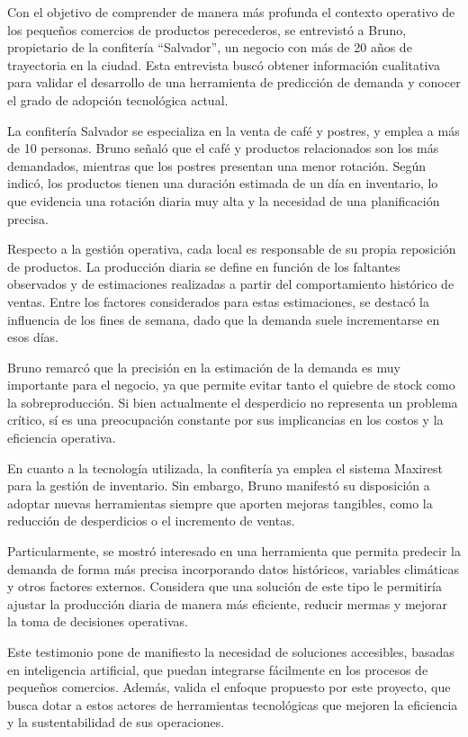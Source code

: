 Con el objetivo de comprender de manera más profunda el contexto operativo de los pequeños comercios de productos perecederos, se entrevistó a Bruno, propietario de la confitería ``Salvador'', un negocio con más de 20 años de trayectoria en la ciudad. Esta entrevista buscó obtener información cualitativa para validar el desarrollo de una herramienta de predicción de demanda y conocer el grado de adopción tecnológica actual.

La confitería Salvador se especializa en la venta de café y postres, y emplea a más de 10 personas. Bruno señaló que el café y productos relacionados son los más demandados, mientras que los postres presentan una menor rotación. Según indicó, los productos tienen una duración estimada de un día en inventario, lo que evidencia una rotación diaria muy alta y la necesidad de una planificación precisa.

Respecto a la gestión operativa, cada local es responsable de su propia reposición de productos. La producción diaria se define en función de los faltantes observados y de estimaciones realizadas a partir del comportamiento histórico de ventas. Entre los factores considerados para estas estimaciones, se destacó la influencia de los fines de semana, dado que la demanda suele incrementarse en esos días.

Bruno remarcó que la precisión en la estimación de la demanda es muy importante para el negocio, ya que permite evitar tanto el quiebre de stock como la sobreproducción. Si bien actualmente el desperdicio no representa un problema crítico, sí es una preocupación constante por sus implicancias en los costos y la eficiencia operativa.

En cuanto a la tecnología utilizada, la confitería ya emplea el sistema Maxirest para la gestión de inventario. Sin embargo, Bruno manifestó su disposición a adoptar nuevas herramientas siempre que aporten mejoras tangibles, como la reducción de desperdicios o el incremento de ventas.

Particularmente, se mostró interesado en una herramienta que permita predecir la demanda de forma más precisa incorporando datos históricos, variables climáticas y otros factores externos. Considera que una solución de este tipo le permitiría ajustar la producción diaria de manera más eficiente, reducir mermas y mejorar la toma de decisiones operativas.

Este testimonio pone de manifiesto la necesidad de soluciones accesibles, basadas en inteligencia artificial, que puedan integrarse fácilmente en los procesos de pequeños comercios. Además, valida el enfoque propuesto por este proyecto, que busca dotar a estos actores de herramientas tecnológicas que mejoren la eficiencia y la sustentabilidad de sus operaciones.


